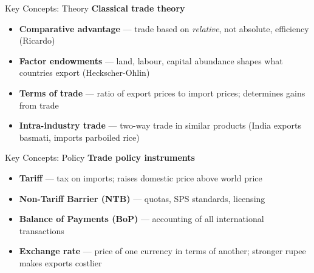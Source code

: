 \documentclass[
  ignorenonframetext,
  aspectratio=169,
]{beamer}
\makeatletter
\providecommand{\tightlist}{%
  \setlength{\itemsep}{0pt}\setlength{\parskip}{0pt}}
\let\quarto@originallabel\label
\DeclareRobustCommand*{\label}[1]{\quarto@originallabel{#1}}
\makeatother
\begin{document}
\begin{frame}{Key Concepts: Theory}
\label{key-concepts-theory}
\textbf{Classical trade theory}

\begin{itemize}
\tightlist
\item
  \textbf{Comparative advantage} --- trade based on \emph{relative}, not
  absolute, efficiency (Ricardo)
\item
  \textbf{Factor endowments} --- land, labour, capital abundance shapes
  what countries export (Heckscher-Ohlin)
\item
  \textbf{Terms of trade} --- ratio of export prices to import prices;
  determines gains from trade
\item
  \textbf{Intra-industry trade} --- two-way trade in similar products
  (India exports basmati, imports parboiled rice)
\end{itemize}

\end{frame}

\begin{frame}{Key Concepts: Policy}
\label{key-concepts-policy}
\textbf{Trade policy instruments}

\begin{itemize}
\tightlist
\item
  \textbf{Tariff} --- tax on imports; raises domestic price above world
  price
\item
  \textbf{Non-Tariff Barrier (NTB)} --- quotas, SPS standards, licensing
\item
  \textbf{Balance of Payments (BoP)} --- accounting of all international
  transactions
\item
  \textbf{Exchange rate} --- price of one currency in terms of another;
  stronger rupee makes exports costlier
\end{itemize}

\end{frame}
\end{document}
